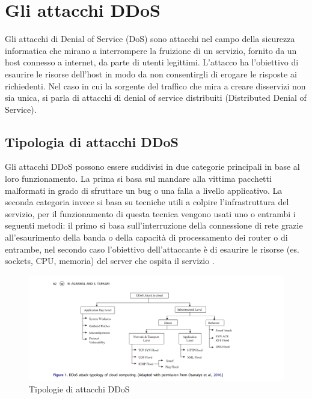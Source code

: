\section{Gli attacchi DDoS}

Gli attacchi di Denial of Service (DoS) sono attacchi nel campo della sicurezza informatica che mirano a interrompere la fruizione di un servizio, fornito da un host connesso a internet, da parte di utenti legittimi. L'attacco ha l'obiettivo di esaurire le risorse dell'host in modo da non consentirgli di erogare le risposte ai richiedenti.
Nel caso in cui la sorgente del traffico che mira a creare disservizi non sia unica, si parla di attacchi di denial of service distribuiti (Distributed Denial of Service).

\subsection{Tipologia di attacchi DDoS}
    
Gli attacchi DDoS possono essere suddivisi in due categorie principali in base al loro funzionamento. La prima si basa sul mandare alla vittima pacchetti malformati in grado di sfruttare un bug o una falla a livello applicativo. La seconda categoria invece si basa su tecniche utili a colpire l'infrastruttura del servizio, per il funzionamento di questa tecnica vengono usati uno o entrambi i seguenti metodi: il primo si basa sull'interruzione della connessione di rete grazie all'esaurimento della banda o della capacità di processamento dei router o di entrambe, nel secondo caso l'obiettivo dell'attaccante è di esaurire le risorse (es. sockets, CPU, memoria) del server che ospita il servizio \cite{ddos_survey_1}.

\begin{figure}[h]
    \includegraphics[width=\hsize]{images/introduzione/tipologie_ddos.png}
    \caption{Tipologie di attacchi DDoS \cite{ddos_survey_3}}
    \centering
\end{figure}

